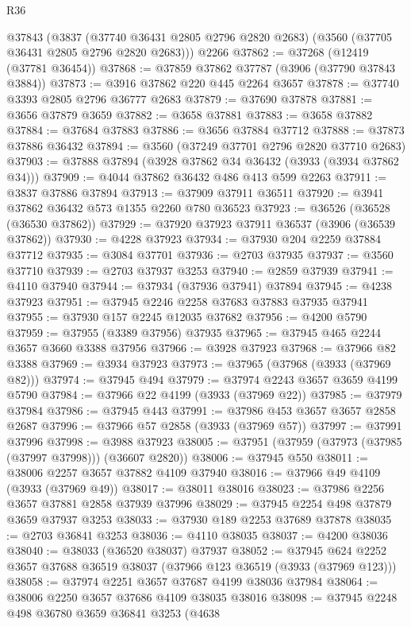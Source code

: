\begin{lexlean}{R36}
\begin{coremodule}
    @37843
    (@3837 (@37740 @36431 @2805 @2796 @2820 @2683) (@3560 (@37705 @36431 @2805 @2796 @2820 @2683)))
    @2266
@37862 := @37268 (@12419 (@37781 @36454))
@37868 := @37859 @37862 @37787 (@3906 (@37790 @37843 @3884))
@37873 := @3916 @37862 @220 @445 @2264 @3657
@37878 := @37740 @3393 @2805 @2796 @36777 @2683
@37879 := @37690 @37878
@37881 := @3656 @37879 @3659
@37882 := @3658 @37881
@37883 := @3658 @37882
@37884 := @37684 @37883
@37886 := @3656 @37884 @37712
@37888 := @37873 @37886 @36432
@37894 := @3560 (@37249 @37701 @2796 @2820 @37710 @2683)
@37903 := @37888 @37894 (@3928 @37862 @34 @36432 (@3933 (@3934 @37862 @34)))
@37909 := @4044 @37862 @36432 @486 @413 @599 @2263
@37911 := @3837 @37886 @37894
@37913 := @37909 @37911 @36511
@37920 := @3941 @37862 @36432 @573 @1355 @2260 @780 @36523
@37923 := @36526 (@36528 (@36530 @37862))
@37929 := @37920 @37923 @37911 @36537 (@3906 (@36539 @37862))
@37930 := @4228 @37923
@37934 := @37930 @204 @2259 @37884 @37712
@37935 := @3084 @37701
@37936 := @2703 @37935
@37937 := @3560 @37710
@37939 := @2703 @37937 @3253
@37940 := @2859 @37939
@37941 := @4110 @37940
@37944 := @37934 (@37936 @37941) @37894
@37945 := @4238 @37923
@37951 := @37945 @2246 @2258 @37683 @37883 @37935 @37941
@37955 := @37930 @157 @2245 @12035 @37682
@37956 := @4200 @5790
@37959 := @37955 (@3389 @37956) @37935
@37965 := @37945 @465 @2244 @3657 @3660 @3388 @37956
@37966 := @3928 @37923
@37968 := @37966 @82 @3388
@37969 := @3934 @37923
@37973 := @37965 (@37968 (@3933 (@37969 @82)))
@37974 := @37945 @494
@37979 := @37974 @2243 @3657 @3659 @4199 @5790
@37984 := @37966 @22 @4199 (@3933 (@37969 @22))
@37985 := @37979 @37984
@37986 := @37945 @443
@37991 := @37986 @453 @3657 @3657 @2858 @2687
@37996 := @37966 @57 @2858 (@3933 (@37969 @57))
@37997 := @37991 @37996
@37998 := @3988 @37923
@38005 := @37951 (@37959 (@37973 (@37985 (@37997 @37998))) (@36607 @2820))
@38006 := @37945 @550
@38011 := @38006 @2257 @3657 @37882 @4109 @37940
@38016 := @37966 @49 @4109 (@3933 (@37969 @49))
@38017 := @38011 @38016
@38023 := @37986 @2256 @3657 @37881 @2858 @37939 @37996
@38029 := @37945 @2254 @498 @37879 @3659 @37937 @3253
@38033 := @37930 @189 @2253 @37689 @37878
@38035 := @2703 @36841 @3253
@38036 := @4110 @38035
@38037 := @4200 @38036
@38040 := @38033 (@36520 @38037) @37937
@38052 := @37945 @624 @2252 @3657 @37688 @36519 @38037 (@37966 @123 @36519 (@3933 (@37969 @123)))
@38058 := @37974 @2251 @3657 @37687 @4199 @38036 @37984
@38064 := @38006 @2250 @3657 @37686 @4109 @38035 @38016
@38098 := @37945
    @2248
    @498
    @36780
    @3659
    @36841
    @3253
    (@4638

\end{coremodule}
\end{lexlean}
